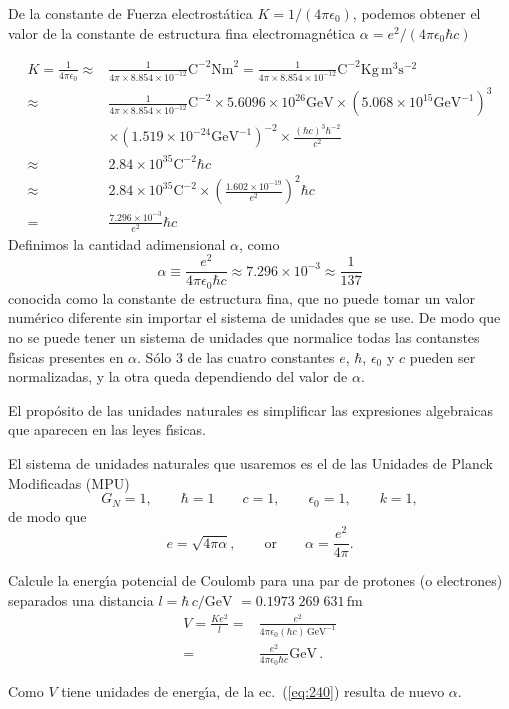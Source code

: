 De la constante de Fuerza electrost\'atica $K=1/(4\pi\epsilon_0)$, podemos obtener el valor de la constante de estructura fina electromagn\'etica $\alpha=e^2/(4\pi\epsilon_0\hbar c)$

\begin{align*}
  K=\frac{1}{4\pi\epsilon_0}\approx&\frac{1}{4\pi\times8.854\times10^{-12}}\text{C}^{-2}\text{Nm}^2
  =\frac{1}{4\pi\times8.854\times10^{-12}}\text{C}^{-2}\text{Kg}\,\text{m}^3\text{s}^{-2}\\
  \approx&\frac{1}{4\pi\times8.854\times10^{-12}}\text{C}^{-2}\times5.6096\times10^{26}\text{GeV}
  \times(5.068\times10^{15}\text{GeV}^{-1})^3\\
  &\times(1.519\times10^{-24}\text{GeV}^{-1})^{-2}\times\frac{(\hbar c)^3\hbar^{-2}}{c^2}\\
  \approx&2.84\times10^{35}\text{C}^{-2}\hbar c\\
  \approx&2.84\times10^{35}\text{C}^{-2}\times
  \left(
    \frac{1.602\times10^{-19}}{e^2}
  \right)^2\hbar c\\
  =&\frac{7.296\times10^{-3}}{e^2}\hbar c
\end{align*}
Definimos la cantidad adimensional $\alpha$, como
\begin{equation*}
  \alpha\equiv\frac{e^2}{4\pi\epsilon_0\hbar c}
\approx7.296\times10^{-3}\approx\frac{1}{137}
\end{equation*}
conocida como la constante de estructura fina, que no puede tomar un
valor num\'erico diferente sin importar el sistema de unidades que se
use. De modo que no se puede tener un sistema de unidades que
normalice todas las contanstes f\'\i sicas presentes en
$\alpha$. S\'olo 3 de las cuatro constantes $e$, $\hbar$, $\epsilon_0$
y $c$ pueden ser normalizadas, y la otra queda dependiendo del valor
de $\alpha$.

El prop\'osito de las unidades naturales es simplificar las expresiones algebraicas que aparecen en las leyes f\'\i sicas. 

El sistema de unidades naturales que usaremos es el de las Unidades de Planck Modificadas (MPU)
\begin{equation}
  G_N=1,\qquad \hbar=1 \qquad c=1,\qquad \epsilon_0=1,\qquad k=1,
\end{equation}
de modo que
\begin{equation}
  e=\sqrt{4\pi\alpha},\qquad\text{or}\qquad \alpha=\frac{e^2}{4\pi}.
\end{equation}
  

\begin{example}
  Calcule la energ\'\i a potencial de Coulomb para una par de protones (o electrones) separados una distancia $l=\hbar\,c/\text{GeV}$ $=0.1973\;269\;631\,\text{fm}$
  \begin{align}
    \label{eq:240}
    V=\frac{K e^2}{l}=&\frac{e^2}{4\pi\epsilon_0(\hbar c)\,\text{GeV}^{-1}}\nonumber\\
    =&\frac{e^2}{4\pi\epsilon_0\hbar c}\text{GeV}\,.
  \end{align}
\end{example}
Como $V$ tiene unidades de energ\'\i a, de la ec.~(\ref{eq:240})  resulta de nuevo $\alpha$.

